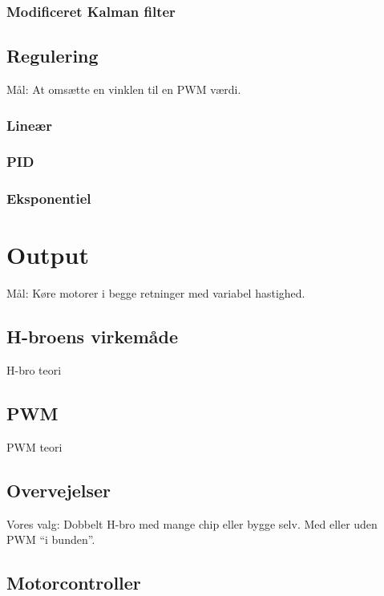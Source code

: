 \documentclass[a4paper,twoside,article,danish,table]{memoir}
\begin{document}
\subsection{Modificeret Kalman filter}

\section{Regulering}
Mål: At omsætte en vinklen til en PWM værdi.
\subsection{Lineær}
\subsection{PID}
\subsection{Eksponentiel}

\chapter{Output}
Mål: Køre motorer i begge retninger med variabel hastighed.
\section{H-broens virkemåde}
H-bro teori
\section{PWM}
PWM teori
\section{Overvejelser}
Vores valg: Dobbelt H-bro med mange chip eller bygge selv. Med eller uden PWM “i bunden”.
\section{Motorcontroller}
\end{document}

